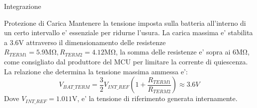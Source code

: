 \begin{section}{Integrazione}
    \begin{subsection}{Protezione di Carica}
        Mantenere la tensione imposta sulla batteria all'interno di un certo intervallo e' essenziale per ridurne l'usura. La carica massima e' stabilita a \(3.6\mathrm{V}\) attraverso il dimensionamento delle resistenze \(R_{TERM1}=5.9\mathrm{M\Omega},R_{TERM2}=4.12\mathrm{M\Omega}\), la somma delle resistenze e' sopra ai \(6\mathrm{M\Omega}\), come consigliato dal produttore del MCU per limitare la corrente di quiescenza. La relazione che determina la tensione massima ammessa e':
        \begin{equation*}
            V_{BAT\_TERM} = \frac{3}{2}V_{INT\_REF}\left(1+\frac{R_{TERM1}}{R_{TERM2}}\right) \approx 3.6V
        \end{equation*}
        {\color{red}Dove \(V_{INT\_REF}=1.011\mathrm{V}\), e' la tensione di riferimento generata internamente.}
    \end{subsection}


\end{section}
